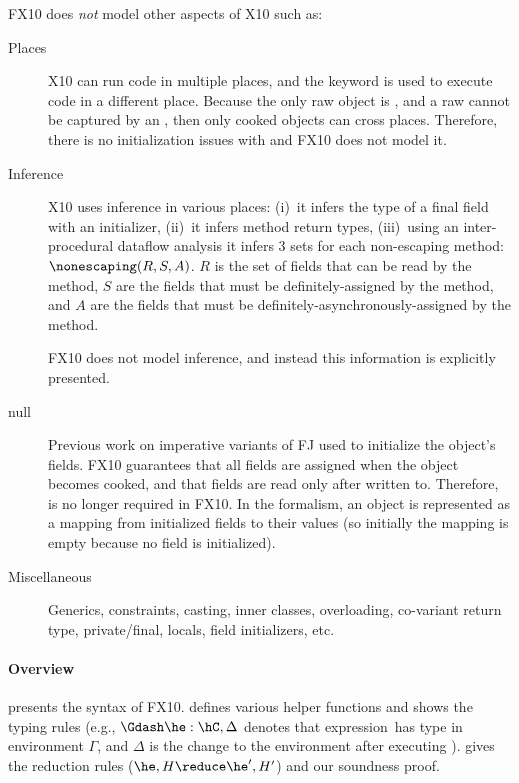 \documentclass[a4paper]{article}
\begin{document}
FX10 does \emph{not} model other aspects of X10 such as:
\begin{description}
  \item[Places] X10 can run code in multiple places, and the  keyword is used to execute code in a different place.
    Because the only raw object is \this,
        and a raw \this cannot be captured by an ,
        then only cooked objects can cross places.
    Therefore, there is no initialization issues with  and FX10 does not model it.
  \item[Inference]
    X10 uses inference in various places:
        (i)~it infers the type of a final field with an initializer,
        (ii)~it infers method return types,
        (iii)~using an inter-procedural dataflow analysis it infers
            3 sets for each non-escaping method: $\nonescaping(R,S,A)$.
            $R$ is the set of fields that can be read by the method,
                $S$ are the fields that must be definitely-assigned by the method,
                and $A$ are the fields that must be definitely-asynchronously-assigned by the method.

    FX10 does not model inference, and instead this information is explicitly presented.
  \item[null]
    Previous work on imperative variants of FJ used \hnull to initialize the object's fields.
    FX10 guarantees that all fields are assigned when the object becomes cooked,
        and that fields are read only after written to.
    Therefore, \hnull is no longer required in FX10.
    In the formalism, an object is represented as a mapping from initialized fields to their values
    (so initially the mapping is empty because no field is initialized).

  \item[Miscellaneous]
    Generics, constraints, casting, inner classes, overloading, co-variant return type, private/final,
    locals, field initializers, etc.
\end{description}


\paragraph{Overview}
 presents the syntax of FX10.
 defines various helper functions and shows the typing rules
    (e.g., $\Gdash \he:\hC, \Delta$ denotes that expression~\he has type \hC in environment $\Gamma$, and $\Delta$ is the change to the environment after executing \he).
 gives the reduction rules ($\he,H \reduce \he',H'$) and our soundness proof.
\end{document}
